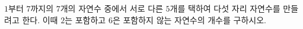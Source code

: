 \hspace*{2mm}\begin{minipage}[t]{\dimexpr\linewidth-2mm\relax}\vspace{0pt}
$1$부터 $7$까지의 $7$개의 자연수 중에서 서로 다른 $5$개를 택하여 다섯 자리 자연수를 만들려고 한다. 이때 $2$는 포함하고 $6$은 포함하지 않는 자연수의 개수를 구하시오.\end{minipage}
